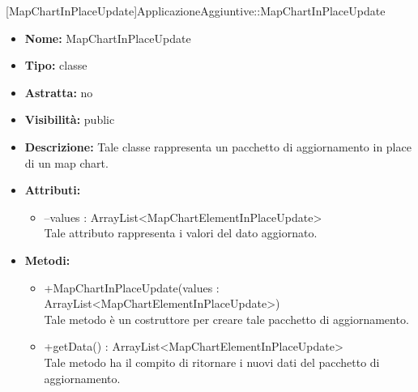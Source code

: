 			[MapChartInPlaceUpdate]{ApplicazioneAggiuntive::MapChartInPlaceUpdate}
			

	
			
			\begin{itemize}
			\item \textbf{Nome:} MapChartInPlaceUpdate
			\item \textbf{Tipo:} classe
			
		\item \textbf{Astratta:}
		no
			\item \textbf{Visibilità:} public
			\item \textbf{Descrizione:} Tale classe rappresenta un pacchetto di aggiornamento in place di un map chart.
			\item \textbf{Attributi:}
				\begin{itemize}
				\setlength{\itemsep}{5pt}
				
					\item[\ding{111}] {--values : ArrayList<MapChartElementInPlaceUpdate>} \\ [1mm] Tale attributo rappresenta i valori del dato aggiornato.
				\end{itemize}
		
			\item \textbf{Metodi:}
				\begin{itemize}
				\setlength{\itemsep}{5pt}
				
					\item[\ding{111}] {{+MapChartInPlaceUpdate(values : ArrayList<MapChartElementInPlaceUpdate>)}} \\ [1mm] Tale metodo è un costruttore per creare tale pacchetto di aggiornamento.
					\item[\ding{111}] {{+getData() : ArrayList<MapChartElementInPlaceUpdate>}} \\ [1mm] Tale metodo ha il compito di ritornare i nuovi dati del pacchetto di aggiornamento.
				\end{itemize}
		
			\end{itemize}
	

